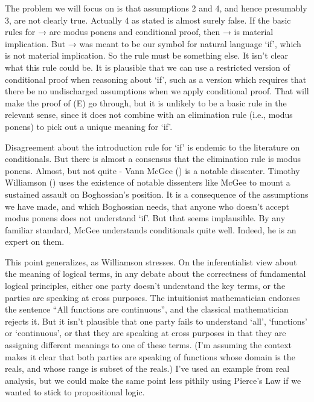 \documentclass[
  11pt,
  letterpaper,
  DIV=11,
  numbers=noendperiod,
  twoside]{scrartcl}
\begin{document}
The problem we will focus on is that assumptions 2 and 4, and hence
presumably 3, are not clearly true. Actually 4 as stated is almost
surely false. If the basic rules for → are modus ponens and conditional
proof, then → is material implication. But → was meant to be our symbol
for natural language `if', which is not material implication. So the
rule must be something else. It isn't clear what this rule could be. It
is plausible that we can use a restricted version of conditional proof
when reasoning about `if', such as a version which requires that there
be no undischarged assumptions when we apply conditional proof. That
will make the proof of (E) go through, but it is unlikely to be a basic
rule in the relevant sense, since it does not combine with an
elimination rule (i.e., modus ponens) to pick out a unique meaning for
`if'.

Disagreement about the introduction rule for `if' is endemic to the
literature on conditionals. But there is almost a consensus that the
elimination rule is modus ponens. Almost, but not quite - Vann McGee
() is a notable dissenter. Timothy
Williamson () uses the
existence of notable dissenters like McGee to mount a sustained assault
on Boghossian's position. It is a consequence of the assumptions we have
made, and which Boghossian needs, that anyone who doesn't accept modus
ponens does not understand `if'. But that seems implausible. By any
familiar standard, McGee understands conditionals quite well. Indeed, he
is an expert on them.

This point generalizes, as Williamson stresses. On the inferentialist
view about the meaning of logical terms, in any debate about the
correctness of fundamental logical principles, either one party doesn't
understand the key terms, or the parties are speaking at cross purposes.
The intuitionist mathematician endorses the sentence ``All functions are
continuous'', and the classical mathematician rejects it. But it isn't
plausible that one party fails to understand `all', `functions' or
`continuous', or that they are speaking at cross purposes in that they
are assigning different meanings to one of these terms. (I'm assuming
the context makes it clear that both parties are speaking of functions
whose domain is the reals, and whose range is subset of the reals.) I've
used an example from real analysis, but we could make the same point
less pithily using Pierce's Law if we wanted to stick to propositional
logic.
\end{document}
